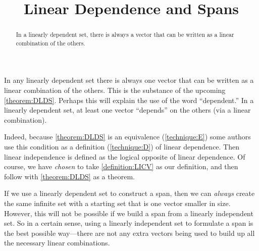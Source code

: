 \documentclass{ximera}
\title{Linear Dependence and Spans}
\begin{document}
\begin{abstract}
  In a linearly dependent set, there is always a vector that can be written as a linear combination of the others. 
\end{abstract}
\maketitle

In any linearly dependent set there is always one vector that can be
written as a linear combination of the others.  This is the substance
of the upcoming \ref{theorem:DLDS}.  Perhaps this will explain the use
of the word ``dependent.''  In a linearly dependent set, at least one
vector ``depends'' on the others (via a linear combination).

Indeed, because \ref{theorem:DLDS} is an equivalence
(\ref{technique:E}) some authors use this condition as a definition
(\ref{technique:D}) of linear dependence.  Then linear independence is
defined as the logical opposite of linear dependence.  Of course, we
have \textit{chosen} to take \ref{definition:LICV} as our definition,
and then follow with \ref{theorem:DLDS} as a theorem.

If we use a linearly dependent set to construct a span, then we can
\textit{always} create the same infinite set with a starting set that
is one vector smaller in size.  However, this will not be possible if
we build a span from a linearly independent set.  So in a certain
sense, using a linearly independent set to formulate a span is the
best possible way---there are not any extra vectors being used to
build up all the necessary linear combinations.
\end{document}
